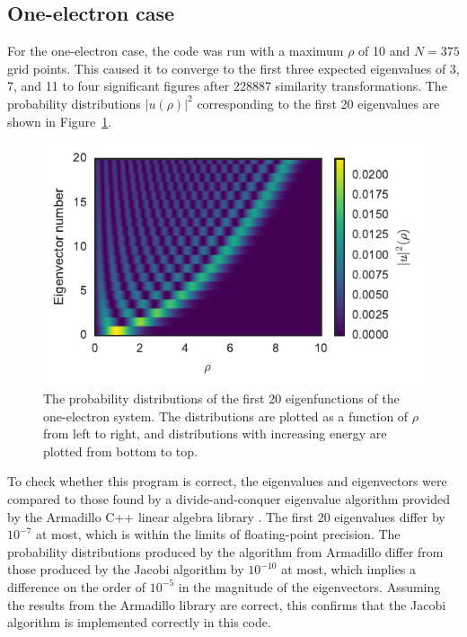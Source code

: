 \documentclass[aps,prc,reprint,nobalancelastpage]{revtex4-1}
\begin{document}
    \subsection{One-electron case}
    \label{sub:oneelecresults}
        For the one-electron case, the code was run with a maximum $\rho$ of 10 and $N=375$ grid points. This caused it to converge to the first three expected eigenvalues of 3, 7, and 11 to four significant figures after \num{228887} similarity transformations. The probability distributions $|u(\rho)|^2$ corresponding to the first 20 eigenvalues are shown in Figure~\ref{fig:eigvecs}.

        \begin{figure}
            \includegraphics{eigenvecs.pdf}
            \caption{The probability distributions of the first 20 eigenfunctions of the one-electron system. The distributions are plotted as a function of $\rho$ from left to right, and distributions with increasing energy are plotted from bottom to top.}
            \label{fig:eigvecs}
        \end{figure}

        To check whether this program is correct, the eigenvalues and eigenvectors were compared to those found by a divide-and-conquer eigenvalue algorithm provided by the Armadillo C++ linear algebra library \cite{Sanderson2010}. The first 20 eigenvalues differ by $10^{-7}$ at most, which is within the limits of floating-point precision. The probability distributions produced by the algorithm from Armadillo differ from those produced by the Jacobi algorithm by $10^{-10}$ at most, which implies a difference on the order of $10^{-5}$ in the magnitude of the eigenvectors. Assuming the results from the Armadillo library are correct, this confirms that the Jacobi algorithm is implemented correctly in this code.
\end{document}
